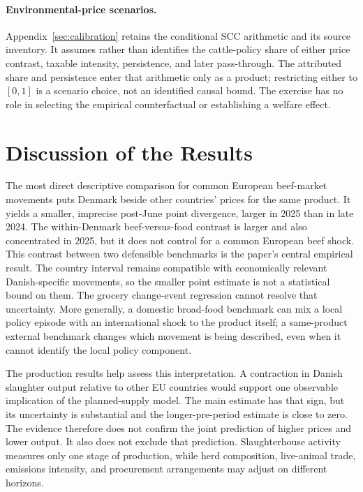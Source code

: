 \documentclass[11pt]{article}
\begin{document}
\paragraph{Environmental-price scenarios.} Appendix~\ref{sec:calibration} retains the conditional SCC arithmetic and its source inventory. It assumes rather than identifies the cattle-policy share of either price contrast, taxable intensity, persistence, and later pass-through. The attributed share and persistence enter that arithmetic only as a product; restricting either to $[0,1]$ is a scenario choice, not an identified causal bound. The exercise has no role in selecting the empirical counterfactual or establishing a welfare effect.

\section{Discussion of the Results}\label{sec:discussion}
The most direct descriptive comparison for common European beef-market movements puts Denmark beside other countries' prices for the same product. It yields a smaller, imprecise post-June point divergence, larger in 2025 than in late 2024. The within-Denmark beef-versus-food contrast is larger and also concentrated in 2025, but it does not control for a common European beef shock. This contrast between two defensible benchmarks is the paper's central empirical result. The country interval remains compatible with economically relevant Danish-specific movements, so the smaller point estimate is not a statistical bound on them. The grocery change-event regression cannot resolve that uncertainty. More generally, a domestic broad-food benchmark can mix a local policy episode with an international shock to the product itself; a same-product external benchmark changes which movement is being described, even when it cannot identify the local policy component.

The production results help assess this interpretation. A contraction in Danish slaughter output relative to other EU countries would support one observable implication of the planned-supply model. The main estimate has that sign, but its uncertainty is substantial and the longer-pre-period estimate is close to zero. The evidence therefore does not confirm the joint prediction of higher prices and lower output. It also does not exclude that prediction. Slaughterhouse activity measures only one stage of production, while herd composition, live-animal trade, emissions intensity, and procurement arrangements may adjust on different horizons.
\end{document}
